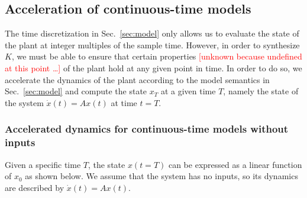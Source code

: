 \documentclass[twocolumn]{autart}    %
\newcommand{\mat}[1]{{#1}}
\renewcommand{\vec}[1]{{#1}}
\renewcommand{\note}[1]{\textcolor{red}{[#1]}}
\begin{document}
\subsection{Acceleration of continuous-time models}\label{sec:continuous_time_accel}

The time discretization in Sec.~\ref{sec:model} only allows us to evaluate
the state of the plant at integer multiples of the sample time.  
However, in
order to synthesize $\mat{K}$, we must be able to ensure that
certain properties \textcolor{red}{[unknown because undefined at this point \ldots]} of the plant hold at any given point in time.  In order
to do so, we accelerate the dynamics of the plant according to the model
semantics in Sec.~\ref{sec:model} and compute the state
$\vec{x}_T$ at a given time $T$,
%
%
namely the state of the system $\dot{\vec{x}}(t)=\mat{A}\vec{x}(t)$ at time
$t=T$.

\subsubsection{Accelerated\! dynamics\! for\! continuous-time\! models\! without\! inputs}\label{sec:cont_acc_no_inputs}
%
Given a specific time $T$, the state $\vec{x}(t=T)$ can be expressed as a
linear function of $\vec{x}_0$ as shown below.  We assume that the system
has no inputs, so its dynamics are described by
$\dot{\vec{x}}(t)=\mat{A}\vec{x}(t)$.
 
\end{document}
